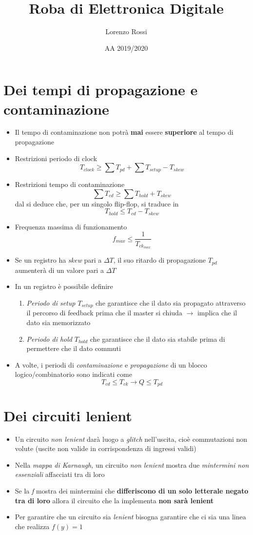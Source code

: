\documentclass{article}
\title{Roba di Elettronica Digitale}
\author{Lorenzo Rossi}
\date{AA 2019/2020}
\begin{document}
\maketitle

\section{Dei tempi di propagazione e contaminazione}
\begin{itemize}
	\item Il tempo di contaminazione non potrà \textbf{mai} essere \textbf{superiore} al tempo di propagazione
	\item Restrizioni periodo di clock \[T_{clock} \geq \sum T_{pd}+ \sum T_{setup} - T_{skew} \]
	\item Restrizioni tempo di contaminazione \[\sum T_{cd} \geq \sum T_{hold} + T_{skew} \]
	dal si deduce che, per un singolo flip-flop, si traduce in  \[T_{hold} \leq T_{cd} - T_{skew} \]
	\item Frequenza massima di funzionamento \[f_{max} \leq \frac{1}{T_{ck_{max}}}\]
	\item Se un registro ha \textit{skew} pari a \(\Delta T\), il suo ritardo di propagazione \(T_{pd}\) aumenterà di un valore pari a \(\Delta T\)
	\item In un registro è possibile definire
	\begin{enumerate}
		\item \textit{Periodo di setup} \(T_{setup}\) che garantisce che il dato sia propagato attraverso il percorso di feedback prima che il master si chiuda \( \rightarrow \) implica che il dato sia memorizzato
		\item \textit{Periodo di hold} \(T_{hold}\) che garantisce che il dato sia stabile prima di permettere che il dato commuti
	\end{enumerate}
	\item A volte, i periodi di \textit{contaminazione} e \textit{propagazione} di un blocco logico/combinatorio sono indicati come \[T_{cd} \leq T_{ck}\rightarrow Q \leq T_{pd} \]
	\end{itemize}

\section{Dei circuiti lenient}
\begin{itemize}
	\item Un circuito \textit{non lenient} darà luogo a \textit{glitch} nell'uscita, cioè commutazioni non volute (uscite non valide in corrispondenza di ingressi validi)
	\item Nella \textit{mappa di Karnaugh,} un circuito \textit{non lenient} mostra due \textit{mintermini non essenziali} affacciati tra di loro 
	\item Se la \textit{f} mostra dei mintermini che \textbf{differiscono di un solo letterale negato tra di loro} allora il circuito che la implementa \textbf{non sarà lenient} 
	\item Per garantire che un circuito sia \textit{lenient} bisogna garantire che ci sia una linea che realizza \(f(y)=1\)
\end{itemize}
\end{document}
